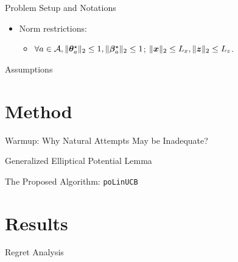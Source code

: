 \documentclass[10pt, xcolor=x11names,compress]{beamer}
\begin{document}
\begin{frame}[label=Background]{Problem Setup and Notations}
\begin{itemize}
\begin{itemize}
        \item Norm restrictions: 
        \begin{itemize}
            \item $\forall a \in {\mathcal{A}}, \|{\bm{\theta}}_a^\star\|_2\leq 1, \|{\bm{\beta}}_{a}^\star\|_2\leq 1 $; $\|{\bm{x}}\|_2\leq L_x, \|{\bm{z}}\|_2 \leq L_z$.
        \end{itemize}
        
    \end{itemize}
\end{itemize}

\end{frame}

\begin{frame}{Assumptions}

\end{frame}


\section{Method}

\begin{frame}[label=warmup]{Warmup: Why Natural Attempts May be Inadequate?}

\end{frame}

\begin{frame}{Generalized Elliptical Potential Lemma}

\end{frame}

\begin{frame}{The Proposed Algorithm: \texttt{poLinUCB}}

\end{frame}


\section{Results}
\begin{frame}{Regret Analysis}

\end{frame}
\end{document}
